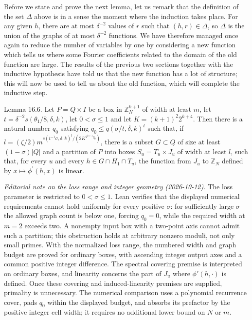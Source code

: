 \documentclass[10pt]{article}
\begin{document}
Before we state and prove the next lemma, let us remark that the definition of the set $\Delta$ above is in a sense the moment where the induction takes place. For any given $h$, there are at most $\delta^{-2}$ values of $r$ such that $(h, r) \in \Delta$, so $\Delta$ is the union of the graphs of at most $\delta^{-2}$ functions. We have therefore managed once again to reduce the number of variables by one by considering a new function which tells us where some Fourier coefficients related to the domain of the old function are large. The results of the previous two sections together with the inductive hypothesis have told us that the new function has a lot of structure; this will now be used to tell us about the old function, which will complete the inductive step.

Lemma 16.6. Let $P=Q \times I$ be a box in $\mathbb{Z}_{N}^{k+1}$ of width at least $m$, let $t=\delta^{-2} s\left(\theta_{1} / 8, \delta, k\right)$, let $0<\sigma\leqslant1$ and let $K=(k+1)^{2}2^{k+4}$. Then there is a natural number $q_{0}$ satisfying $q_{0}\leqslant q(\sigma/t,\delta,k)^{t}$ such that, if $l=(\zeta / 2) m^{c\left(t^{-1} \sigma, \delta, k\right)^{t} / \left(2 K^{2^{k+1} q_{0}}\right)}$, there is a subset $G \subset Q$ of size at least $(1-\sigma)|Q|$ and a partition of $P$ into boxes $S_{u}=T_{u} \times J_{u}$ of width at least $l$, such that, for every $u$ and every $h \in G \cap H_{1} \cap T_{u}$, the function from $J_{u}$ to $\mathbb{Z}_{N}$ defined by $x \mapsto \phi^{\prime}(h, x)$ is linear.


\emph{Editorial note on the loss range and integer geometry (2026-10-12).}
The loss parameter is restricted to $0<\sigma\leqslant1$. Lean verifies
that the displayed numerical requirements cannot hold uniformly for every
positive $\sigma$: for sufficiently large $\sigma$ the allowed graph count
is below one, forcing $q_0=0$, while the required width at $m=2$ exceeds two.
A nonempty input box with a two-point axis cannot admit such a partition;
this obstruction holds at arbitrary nonzero moduli, not only small primes.
With the normalized loss range, the numbered width and graph budget are
proved for ordinary boxes, with ascending integer output axes and a common
positive integer difference. The spectral covering premise is interpreted
on ordinary boxes, and linearity concerns the part of $J_u$ where
$\phi'(h,\mathord\cdot)$ is defined. Once these covering and induced-linearity
premises are supplied, primality is unnecessary. The numerical comparison
uses a polynomial recurrence cover, pads $q_0$ within the displayed budget,
and absorbs its prefactor by the positive integer cell width; it requires
no additional lower bound on $N$ or $m$.
\end{document}
